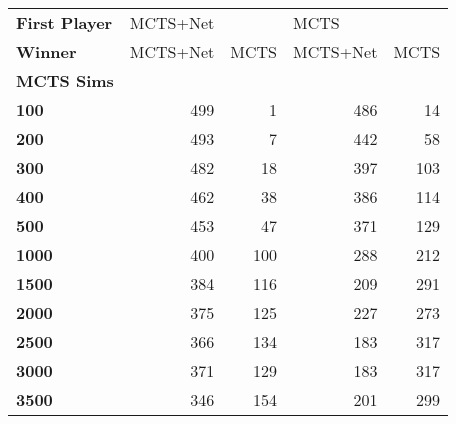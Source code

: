 \begin{tabular}{lrrrr}
\toprule
\textbf{First Player} & \multicolumn{2}{l}{MCTS+Net} & \multicolumn{2}{l}{MCTS} \\
\textbf{Winner} & MCTS+Net & MCTS & MCTS+Net & MCTS \\
\textbf{MCTS Sims} &          &      &          &      \\
\midrule
\textbf{100      } &      499 &    1 &      486 &   14 \\
\textbf{200      } &      493 &    7 &      442 &   58 \\
\textbf{300      } &      482 &   18 &      397 &  103 \\
\textbf{400      } &      462 &   38 &      386 &  114 \\
\textbf{500      } &      453 &   47 &      371 &  129 \\
\textbf{1000     } &      400 &  100 &      288 &  212 \\
\textbf{1500     } &      384 &  116 &      209 &  291 \\
\textbf{2000     } &      375 &  125 &      227 &  273 \\
\textbf{2500     } &      366 &  134 &      183 &  317 \\
\textbf{3000     } &      371 &  129 &      183 &  317 \\
\textbf{3500     } &      346 &  154 &      201 &  299 \\
\bottomrule
\end{tabular}

